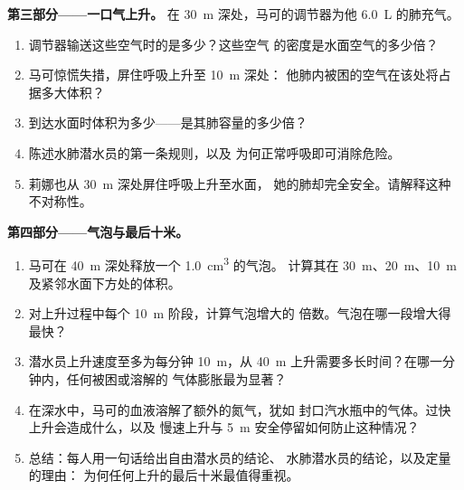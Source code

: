 \begin{problem}
\medskip
\noindent\textbf{第三部分——一口气上升。}
在 \qty{30}{m} 深处，马可的调节器为他 \qty{6.0}{L} 的肺充气。
\begin{enumerate}[resume]
  \item 调节器输送这些空气时的是多少？这些空气
        的密度是水面空气的多少倍？
  \item 马可惊慌失措，屏住呼吸上升至 \qty{10}{m} 深处：
        他肺内被困的空气在该处将占据多大体积？
  \item 到达水面时体积为多少——是其肺容量的多少倍？
  \item 陈述水肺潜水员的第一条规则，以及
        为何正常呼吸即可消除危险。
  \item 莉娜也从 \qty{30}{m} 深处屏住呼吸上升至水面，
        她的肺却完全安全。请解释这种不对称性。
\end{enumerate}

\medskip
\noindent\textbf{第四部分——气泡与最后十米。}
\begin{enumerate}[resume]
  \item 马可在 \qty{40}{m} 深处释放一个 \qty{1.0}{cm^3} 的气泡。
        计算其在 \qty{30}{m}、\qty{20}{m}、\qty{10}{m}
        及紧邻水面下方处的体积。
  \item 对上升过程中每个 \qty{10}{m} 阶段，计算气泡增大的
        倍数。气泡在哪一段增大得最快？
  \item 潜水员上升速度至多为每分钟 \qty{10}{m}，从
        \qty{40}{m} 上升需要多长时间？在哪一分钟内，任何被困或溶解的
        气体膨胀最为显著？
  \item 在深水中，马可的血液溶解了额外的氮气，犹如
        封口汽水瓶中的气体。过快上升会造成什么，以及
        慢速上升与 \qty{5}{m} 安全停留如何防止这种情况？
  \item 总结：每人用一句话给出自由潜水员的结论、
        水肺潜水员的结论，以及定量的理由：
        为何任何上升的最后十米最值得重视。
\end{enumerate}
\end{problem}

